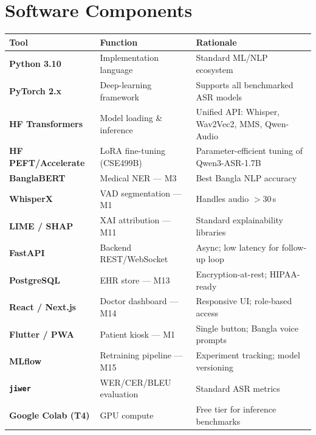 \documentclass[11pt,a4paper]{article}
\begin{document}
\label{fig:flowchart}

\section{Software Components}

{\footnotesize\setlength{\tabcolsep}{4pt}\renewcommand{\arraystretch}{1.2}
\begin{tabularx}{\linewidth}{>{\bfseries}p{2.8cm} p{3.2cm} X}
\toprule
Tool & Function & Rationale \\
\midrule
Python 3.10          & Implementation language       & Standard ML/NLP ecosystem \\
PyTorch 2.x          & Deep-learning framework       & Supports all benchmarked ASR models \\
HF Transformers      & Model loading \& inference    & Unified API: Whisper, Wav2Vec2, MMS, Qwen-Audio \\
HF PEFT/Accelerate   & LoRA fine-tuning (CSE499B)    & Parameter-efficient tuning of Qwen3-ASR-1.7B \\
BanglaBERT           & Medical NER --- M3            & Best Bangla NLP accuracy \\
WhisperX             & VAD segmentation --- M1       & Handles audio $>$30\,s \\
LIME / SHAP          & XAI attribution --- M11       & Standard explainability libraries \\
FastAPI              & Backend REST/WebSocket        & Async; low latency for follow-up loop \\
PostgreSQL           & EHR store --- M13             & Encryption-at-rest; HIPAA-ready \\
React / Next.js      & Doctor dashboard --- M14      & Responsive UI; role-based access \\
Flutter / PWA        & Patient kiosk --- M1          & Single button; Bangla voice prompts \\
MLflow               & Retraining pipeline --- M15   & Experiment tracking; model versioning \\
\texttt{jiwer}       & WER/CER/BLEU evaluation       & Standard ASR metrics \\
Google Colab (T4)    & GPU compute                   & Free tier for inference benchmarks \\
\bottomrule
\end{tabularx}}
\end{document}
